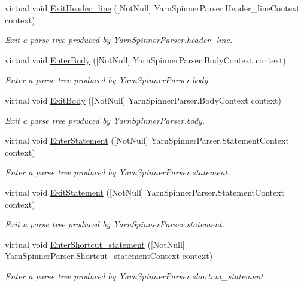 \begin{DoxyCompactItemize}
virtual void \hyperlink{a00190_a5565c81951adcedcdd6a5f1b0fff1dea}{Exit\-Header\-\_\-line} (\mbox{[}Not\-Null\mbox{]} Yarn\-Spinner\-Parser.\-Header\-\_\-line\-Context context)
\begin{DoxyCompactList}\small\item\em Exit a parse tree produced by Yarn\-Spinner\-Parser.\-header\-\_\-line. \end{DoxyCompactList}\item 
virtual void \hyperlink{a00190_a0bb84237855d76cd67c0214afeaece3c}{Enter\-Body} (\mbox{[}Not\-Null\mbox{]} Yarn\-Spinner\-Parser.\-Body\-Context context)
\begin{DoxyCompactList}\small\item\em Enter a parse tree produced by Yarn\-Spinner\-Parser.\-body. \end{DoxyCompactList}\item 
virtual void \hyperlink{a00190_ab0f6c8acd95f6213546c6f1f8370fd67}{Exit\-Body} (\mbox{[}Not\-Null\mbox{]} Yarn\-Spinner\-Parser.\-Body\-Context context)
\begin{DoxyCompactList}\small\item\em Exit a parse tree produced by Yarn\-Spinner\-Parser.\-body. \end{DoxyCompactList}\item 
virtual void \hyperlink{a00190_a0a1a5165215f2eed1a2fdee94218c472}{Enter\-Statement} (\mbox{[}Not\-Null\mbox{]} Yarn\-Spinner\-Parser.\-Statement\-Context context)
\begin{DoxyCompactList}\small\item\em Enter a parse tree produced by Yarn\-Spinner\-Parser.\-statement. \end{DoxyCompactList}\item 
virtual void \hyperlink{a00190_a94c70caf87bdc4c46223b1bfc9031c42}{Exit\-Statement} (\mbox{[}Not\-Null\mbox{]} Yarn\-Spinner\-Parser.\-Statement\-Context context)
\begin{DoxyCompactList}\small\item\em Exit a parse tree produced by Yarn\-Spinner\-Parser.\-statement. \end{DoxyCompactList}\item 
virtual void \hyperlink{a00190_a928af133a0075061959dc54bbcf0d006}{Enter\-Shortcut\-\_\-statement} (\mbox{[}Not\-Null\mbox{]} Yarn\-Spinner\-Parser.\-Shortcut\-\_\-statement\-Context context)
\begin{DoxyCompactList}\small\item\em Enter a parse tree produced by Yarn\-Spinner\-Parser.\-shortcut\-\_\-statement. \end{DoxyCompactList}\item 

\end{DoxyCompactItemize}
